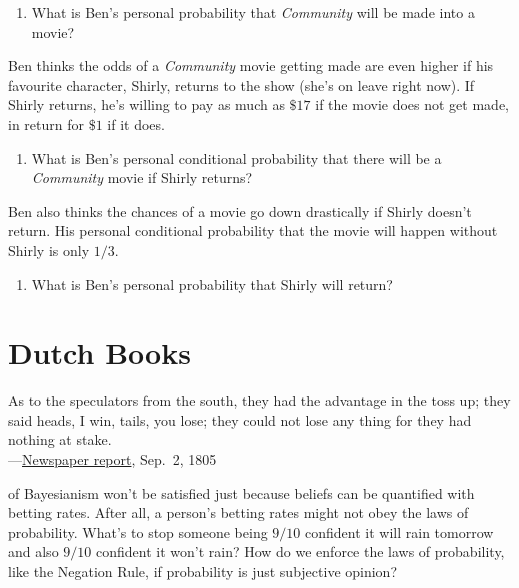 \documentclass[justified]{tufte-book}
\providecommand{\tightlist}{%
  \setlength{\itemsep}{0pt}\setlength{\parskip}{0pt}}
\newenvironment{epigraph}%
{
\begin{flushright}    
\begin{minipage}{20em}
\begin{flushright}
\itshape
}%
{
\end{flushright}
\end{minipage}
\end{flushright}
}
\theoremstyle{definition}
\theoremstyle{definition}
\theoremstyle{definition}
\theoremstyle{definition}
\theoremstyle{remark}
\begin{document}
\begin{enumerate}
  \begin{enumerate}
  \def\labelenumii{\alph{enumii}.}
  \tightlist
  \item
    What is Ben's personal probability that \emph{Community} will be made into a movie?
  \end{enumerate}

  Ben thinks the odds of a \emph{Community} movie getting made are even higher if his favourite character, Shirly, returns to the show (she's on leave right now). If Shirly returns, he's willing to pay as much as \(\$17\) if the movie does not get made, in return for \(\$1\) if it does.

  \begin{enumerate}
  \def\labelenumii{\alph{enumii}.}
  \setcounter{enumii}{1}
  \tightlist
  \item
    What is Ben's personal conditional probability that there will be a \emph{Community} movie if Shirly returns?
  \end{enumerate}

  Ben also thinks the chances of a movie go down drastically if Shirly doesn't return. His personal conditional probability that the movie will happen without Shirly is only \(1/3\).

  \begin{enumerate}
  \def\labelenumii{\alph{enumii}.}
  \setcounter{enumii}{2}
  \tightlist
  \item
    What is Ben's personal probability that Shirly will return?
  \end{enumerate}
\end{enumerate}

\hypertarget{dutch-books}{%
\chapter{Dutch Books}\label{dutch-books}}

\begin{epigraph}
As to the speculators from the south, they had the advantage in the toss
up; they said heads, I win, tails, you lose; they could not lose any
thing for they had nothing at stake.\\
---\href{https://chroniclingamerica.loc.gov/lccn/sn83045242/1805-09-02/ed-1/seq-2.pdf}{Newspaper
report}, Sep.~2, 1805
\end{epigraph}

 of Bayesianism won't be satisfied just because beliefs can be quantified with betting rates. After all, a person's betting rates might not obey the laws of probability. What's to stop someone being \(9/10\) confident it will rain tomorrow and also \(9/10\) confident it won't rain? How do we enforce the laws of probability, like the Negation Rule, if probability is just subjective opinion?
\end{document}
